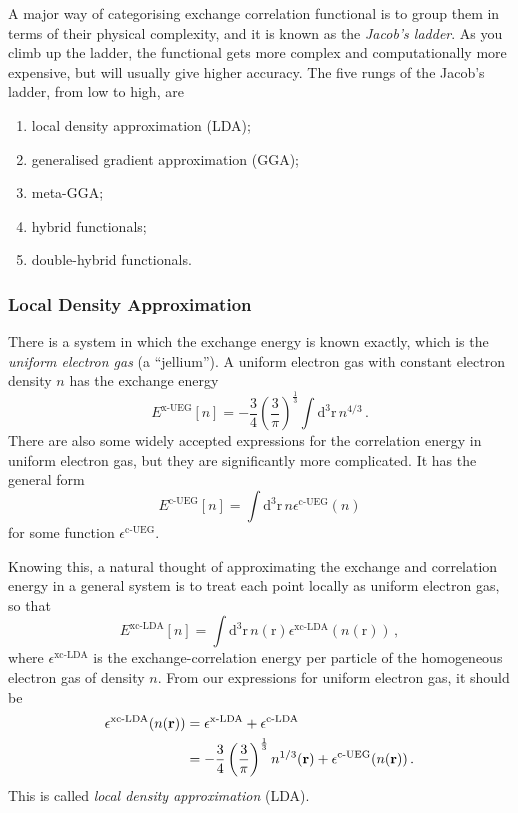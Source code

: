 \documentclass{article}
\theoremstyle{plain}\theoremheaderfont{\normalfont\itshape}\theorembodyfont{\rmfamily}\theoremseparator{.}\newtheorem*{rem}{Remark}\newtheorem*{ex}{Example}\newtheorem*{proof}{Proof}\newtheorem*{altp}{Alternative proof}
\theoremstyle{plain}\theoremheaderfont{\normalfont\bfseries}\theorembodyfont{\rmfamily}\theoremseparator{.}\newtheorem{thm}{Theorem}[section]\newtheorem{lem}[thm]{Lemma}\newtheorem{prop}[thm]{Proposition}\newtheorem*{cor}{Corollary}\newtheorem{defn}[thm]{Definition}\newtheorem{clm}[thm]{Claim}\newtheorem{clminproof}{Claim}\newtheorem{pos}{Postulate}[section]
\theoremstyle{break}\theoremheaderfont{\normalfont\itshape}\theorembodyfont{\rmfamily}\theoremseparator{.\medskip}\newtheorem*{proofskip}{Proof}\newtheorem*{exs}{Examples}\newtheorem*{rems}{Remarks}
\theoremstyle{break}\theoremheaderfont{\normalfont\bfseries}\theorembodyfont{\rmfamily}\theoremseparator{.\medskip}\newtheorem{lemskip}[thm]{Lemma}\newtheorem{defnskip}[thm]{Definition}\newtheorem{propskip}[thm]{Proposition}\newtheorem{thmskip}[thm]{Theorem}
\numberwithin{equation}{section}
\newcommand{\dd}[2][]{\mathrm{d}^{#1} #2\,}
\newcommand{\vb}[1]{\bm{\mathrm{#1}}}
\begin{document}
    A major way of categorising exchange correlation functional is to group them in terms of their physical complexity, and it is known as the \textit{Jacob's ladder}. As you climb up the ladder, the functional gets more complex and computationally more expensive, but will usually give higher accuracy. The five rungs of the Jacob's ladder, from low to high, are
    \begin{enumerate}[topsep=0pt,label=(\roman*)]
        \item local density approximation (LDA);
        \item generalised gradient approximation (GGA);
        \item meta-GGA;
        \item hybrid functionals;
        \item double-hybrid functionals.
    \end{enumerate}

    \subsubsection{Local Density Approximation}
    There is a system in which the exchange energy is known exactly, which is the \textit{uniform electron gas} (a ``jellium''). A uniform electron gas with constant electron density \(n\) has the exchange energy
    \begin{equation}
        E^{\text{x-UEG}}[n]=-\frac{3}{4}\left(\frac{3}{\pi}\right)^{\frac{1}{3}}\int\dd[3]{\vb{r}} n^{4/3}\,.
    \end{equation}
    There are also some widely accepted expressions for the correlation energy in uniform electron gas, but they are significantly more complicated. It has the general form
    \begin{equation}
        E^{\text{c-UEG}}[n]=\int\dd[3]{\vb{r}} n \epsilon^{\text{c-UEG}}(n)
    \end{equation}
    for some function \(\epsilon^{\text{c-UEG}}\).

    Knowing this, a natural thought of approximating the exchange and correlation energy in a general system is to treat each point locally as uniform electron gas, so that
    \begin{equation}
        E^{\text{xc-LDA}}[n]=\int\dd[3]{\vb{r}} n(\vb{r})\epsilon^{\text{xc-LDA}}(n(\vb{r}))\,,
    \end{equation}
    where \(\epsilon^{\text{xc-LDA}}\) is the exchange-correlation energy per particle of the homogeneous electron gas of density \(n\). From our expressions for uniform electron gas, it should be
    \begin{align}
        \epsilon^{\text{xc-LDA}}(n(\vb{r}))&=\epsilon^{\text{x-LDA}}+\epsilon^{\text{c-LDA}}\notag\\
        &=-\frac{3}{4}\left(\frac{3}{\pi}\right)^{\frac{1}{3}}n^{1/3}(\vb{r})+\epsilon^{\text{c-UEG}}(n(\vb{r}))\,.
    \end{align}
    This is called \textit{local density approximation} (LDA).
\end{document}
